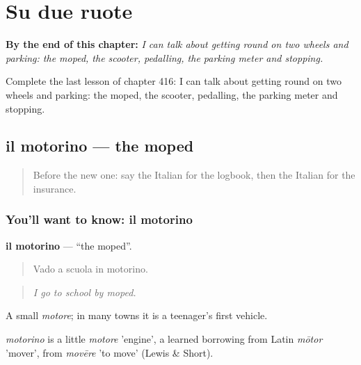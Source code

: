 
\chapter{Su due ruote}
\label{ch:it-su-due-ruote}

\begin{chapteropening}
\textbf{By the end of this chapter:} \emph{I can talk about getting round on two wheels and parking: the moped, the scooter, pedalling, the parking meter and stopping.}

Complete the last lesson of chapter 416: I can talk about getting round on two wheels and parking: the moped, the scooter, pedalling, the parking meter and stopping.
\end{chapteropening}

\section[il motorino]{il motorino — the moped}

\label{lesson:IT-C416-motorino}



\begin{quote}
Before the new one: say the Italian for the logbook, then the Italian for the insurance.
\end{quote}

\subsection*{You'll want to know: il motorino}
\textbf{il motorino} — \textquotedblleft{}the moped\textquotedblright{}.

\begin{quote}
Vado a scuola in motorino.
\end{quote}

\begin{quote}
\emph{I go to school by moped.}
\end{quote}

A small \emph{motore}; in many towns it is a teenager's first vehicle.

\begin{cousinweb}
\emph{motorino} is a little \emph{motore} 'engine', a learned borrowing from Latin \emph{mōtor} 'mover', from \emph{movēre} 'to move' (Lewis \& Short).
\end{cousinweb}

